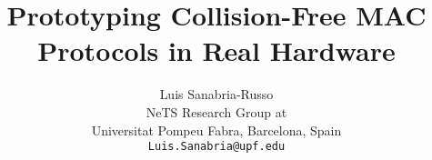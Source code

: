 \documentclass[a4paper,journal]{IEEEtran}
\begin{document}
 \title{Prototyping Collision-Free MAC Protocols in Real Hardware}



\author{Luis Sanabria-Russo \\
		NeTS Research Group at\\
		Universitat Pompeu Fabra, Barcelona, Spain\\
		\texttt{Luis.Sanabria@upf.edu}}



\maketitle
\end{document}
